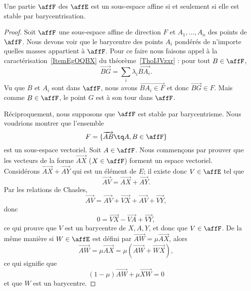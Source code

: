 \begin{proposition}
    Une partie \( \affF\) des \( \affE\) est un sous-espace affine si et seulement si elle est stable par barycentrisation.
\end{proposition}

\begin{proof}
    Soit \( \affF\) une sous-espace affine de direction \( F\) et \( A_1,\ldots, A_n\) des points de \( \affF\). Nous devons voir que le barycentre des points \( A_i\) pondérés de n'importe quelles masses appartient à \( \affF\). Pour ce faire nous faisons appel à la caractérisation~\ref{ItemEgOQBX} du théorème~\ref{ThoIJVzxr} : pour tout \( B\in\affF\),
    \begin{equation}
        \overrightarrow{ BG }=\sum_i\lambda_i\overrightarrow{ BA_i }.
    \end{equation}
    Vu que \( B\) et \( A_i\) sont dans \( \affF\), nous avons \( \overrightarrow{ BA_i\in F }\) et donc \( \overrightarrow{ BG }\in F\). Mais comme \( B\in\affF\), le point \( G\) est à son tour dans \( \affF\).

    Réciproquement, nous supposons que \( \affF\) est stable par barycentrisme. Nous voudrions montrer que l'ensemble
    \begin{equation}        \label{EqCmyWGi}
        F=\{ \overrightarrow{ AB }\tq A,B\in \affF \}
    \end{equation}
    est un sous-espace vectoriel. Soit \( A\in\affF\). Nous commençons par prouver que les vecteurs de la forme \( \overrightarrow{ AX }\) (\( X\in \affF\)) forment un espace vectoriel. Considérons \( \overrightarrow{ AX }+\overrightarrow{ AY }\) qui est un élément de \( E\); il existe donc \( V\in \affE\) tel que
    \begin{equation}
        \overrightarrow{ AV }=\overrightarrow{ AX }+\overrightarrow{ AY }.
    \end{equation}
    Par les relations de Chasles,
    \begin{equation}
        \overrightarrow{ AV }=\overrightarrow{ AV }+\overrightarrow{ VX }+\overrightarrow{ AV }+\overrightarrow{ VY },
    \end{equation}
    donc
    \begin{equation}
        0=\overrightarrow{ VX }-\overrightarrow{ VA }+\overrightarrow{ VY },
    \end{equation}
    ce qui prouve que \( V\) est un barycentre de \( X,A,Y\), et donc que \( V\in\affF\). De la même manière si \( W\in \affE\) est défini par \( \overrightarrow{ AW }=\mu \overrightarrow{ AX }\), alors
    \begin{equation}
        \overrightarrow{ AW }=\mu\overrightarrow{ AX }=\mu(\overrightarrow{ AW }+\overrightarrow{ WX }),
    \end{equation}
    ce qui signifie que
    \begin{equation}
        (1-\mu)\overrightarrow{ AW }+\mu\overrightarrow{ XW }=0
    \end{equation}
    et que \( W\) est un barycentre.


\end{proof}
